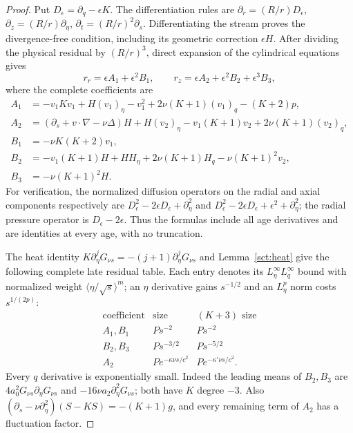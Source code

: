 \begin{proof}
Put $D_\epsilon=\partial_q-\epsilon K$.
The differentiation rules are
$\partial_r=(R/r)D_\epsilon$, $\partial_z=(R/r)\partial_\eta$,
$\partial_t=(R/r)^2\partial_s$. Differentiating the stream proves
the divergence-free condition, including its geometric correction $\epsilon H$.
After dividing the physical residual by $(R/r)^3$, direct expansion
of the cylindrical equations gives
\[
 r_r=\epsilon A_1+\epsilon^2B_1,\qquad
 r_z=\epsilon A_2+\epsilon^2B_2+\epsilon^3B_3,
\]
where the complete coefficients are
\begin{align*}
 A_1&=-v_1Kv_1+H(v_1)_\eta-v_1^2
             +2\nu(K+1)(v_1)_q-(K+2)p,\\
 A_2&=(\partial_s+v\cdot\nabla-\nu\Delta)H
             +H(v_2)_\eta-v_1(K+1)v_2+2\nu(K+1)(v_2)_q,\\
 B_1&=-\nu K(K+2)v_1,\\
 B_2&=-v_1(K+1)H+HH_\eta+2\nu(K+1)H_q-\nu(K+1)^2v_2,\\
 B_3&=-\nu(K+1)^2H.
\end{align*}
For verification, the normalized diffusion operators on the radial
and axial components respectively are
$D_\epsilon^2-2\epsilon D_\epsilon+\partial_\eta^2$ and
$D_\epsilon^2-2\epsilon D_\epsilon+\epsilon^2+\partial_\eta^2$;
the radial pressure operator is $D_\epsilon-2\epsilon$.
Thus the formulas include all age derivatives and are identities at
every age, with no truncation.

The heat identity $K\partial_\eta^jG_{\nu s}=-(j+1)
\partial_\eta^jG_{\nu s}$ and Lemma~\ref{sct:heat} give the following
complete late residual table. Each entry denotes its
$L^\infty_\eta L^\infty_q$ bound with normalized weight
$\langle\eta/\sqrt{s}\rangle^m$; an $\eta$ derivative gains
$s^{-1/2}$ and an $L^p_\eta$ norm costs $s^{1/(2p)}$:
\[
\begin{array}{c|c|c}
 \text{coefficient}&\text{size}&(K+3)\text{ size}\\ \hline
 A_1,B_1&Ps^{-2}&Ps^{-2}\\
 B_2,B_3&Ps^{-3/2}&Ps^{-5/2}\\
 A_2&Pe^{-\kappa\nu s/c^2}&Pe^{-\kappa'\nu s/c^2}.
\end{array}
\]
Every $q$ derivative is exponentially small. Indeed the leading means
of $B_2,B_3$ are $4a_0^2G_{\nu s}\partial_\eta G_{\nu s}$ and
$-16\nu a_2\partial_\eta^2G_{\nu s}$; both have $K$ degree $-3$.
Also $(\partial_s-\nu\partial_\eta^2)(S-KS)=-(K+1)g$,
and every remaining term of $A_2$ has a fluctuation factor.


\end{proof}
